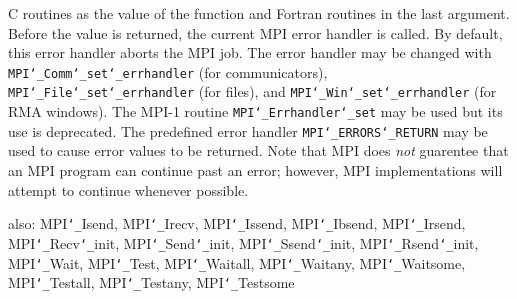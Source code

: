 C routines as the value of the function and Fortran routines in the last
argument.  Before the value is returned, the current MPI error handler is
called.  By default, this error handler aborts the MPI job.  The error handler
may be changed with {\tt MPI{\tt \char`\_}Comm{\tt \char`\_}set{\tt \char`\_}errhandler} (for communicators),
{\tt MPI{\tt \char`\_}File{\tt \char`\_}set{\tt \char`\_}errhandler} (for files), and {\tt MPI{\tt \char`\_}Win{\tt \char`\_}set{\tt \char`\_}errhandler} (for
RMA windows).  The MPI-1 routine {\tt MPI{\tt \char`\_}Errhandler{\tt \char`\_}set} may be used but
its use is deprecated.  The predefined error handler
{\tt MPI{\tt \char`\_}ERRORS{\tt \char`\_}RETURN} may be used to cause error values to be returned.
Note that MPI does {\em not} guarentee that an MPI program can continue past
an error; however, MPI implementations will attempt to continue whenever
possible.
\par
{}
\par
{}
also: MPI{\tt \char`\_}Isend, MPI{\tt \char`\_}Irecv, MPI{\tt \char`\_}Issend, MPI{\tt \char`\_}Ibsend, MPI{\tt \char`\_}Irsend,
\nextline
MPI{\tt \char`\_}Recv{\tt \char`\_}init, MPI{\tt \char`\_}Send{\tt \char`\_}init, MPI{\tt \char`\_}Ssend{\tt \char`\_}init, MPI{\tt \char`\_}Rsend{\tt \char`\_}init, MPI{\tt \char`\_}Wait,
MPI{\tt \char`\_}Test, MPI{\tt \char`\_}Waitall, MPI{\tt \char`\_}Waitany, MPI{\tt \char`\_}Waitsome, MPI{\tt \char`\_}Testall, MPI{\tt \char`\_}Testany,
MPI{\tt \char`\_}Testsome
\endmanpage
